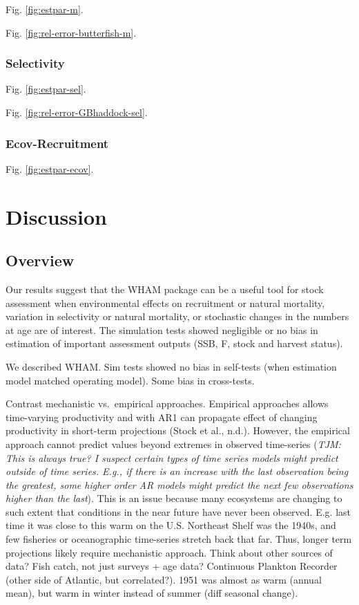 \documentclass[]{article}
\begin{document}
Fig. \ref{fig:estpar-m}.

Fig. \ref{fig:rel-error-butterfish-m}.

\hypertarget{selectivity-1}{%
\subsubsection{Selectivity}\label{selectivity-1}}

Fig. \ref{fig:estpar-sel}.

Fig. \ref{fig:rel-error-GBhaddock-sel}.

\hypertarget{ecov-recruitment-1}{%
\subsubsection{Ecov-Recruitment}\label{ecov-recruitment-1}}

Fig. \ref{fig:estpar-ecov}.

\hypertarget{discussion}{%
\section{Discussion}\label{discussion}}

\hypertarget{overview}{%
\subsection{Overview}\label{overview}}

Our results suggest that the WHAM package can be a useful tool for stock
assessment when environmental effects on recruitment or natural
mortality, variation in selectivity or natural mortality, or stochastic
changes in the numbers at age are of interest. The simulation tests
showed negligible or no bias in estimation of important assessment
outputs (SSB, F, stock and harvest status).

We described WHAM. Sim tests showed no bias in self-tests (when
estimation model matched operating model). Some bias in cross-tests.

Contrast mechanistic vs.~empirical approaches. Empirical approaches
allows time-varying productivity and with AR1 can propagate effect of
changing productivity in short-term projections (Stock et al., n.d.).
However, the empirical approach cannot predict values beyond extremes in
observed time-series (\emph{TJM: This is always true? I suspect certain
types of time series models might predict outside of time series. E.g.,
if there is an increase with the last observation being the greatest,
some higher order AR models might predict the next few observations
higher than the last}). This is an issue because many ecosystems are
changing to such extent that conditions in the near future have never
been observed. E.g. last time it was close to this warm on the U.S.
Northeast Shelf was the 1940s, and few fisheries or oceanographic
time-series stretch back that far. Thus, longer term projections likely
require mechanistic approach. Think about other sources of data? Fish
catch, not just surveys + age data? Continuous Plankton Recorder (other
side of Atlantic, but correlated?). 1951 was almost as warm (annual
mean), but warm in winter instead of summer (diff seasonal change).
\end{document}

